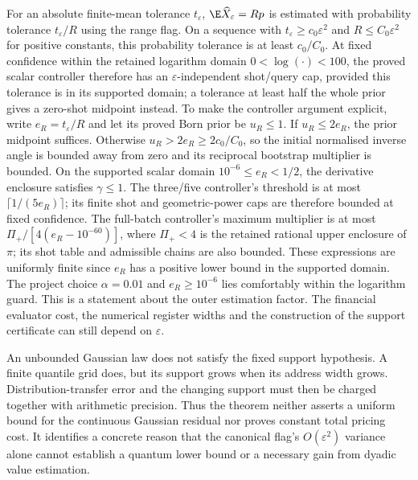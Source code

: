 For an absolute finite-mean tolerance $t_\varepsilon$,
$\E\widehat X_\varepsilon=R p$ is estimated with probability tolerance
$t_\varepsilon/R$ using the range flag. On a sequence with
$t_\varepsilon\geq c_0\varepsilon^2$ and
$R\leq C_0\varepsilon^2$ for positive constants, this probability
tolerance is at least $c_0/C_0$. At fixed confidence within the retained logarithm domain $0<\log(\cdot)<100$, the proved scalar
controller therefore has an $\varepsilon$-independent shot/query cap,
provided this tolerance is in its supported domain; a tolerance at least
half the whole prior gives a zero-shot midpoint instead. To make the controller argument explicit, write $e_R=t_\varepsilon/R$
and let its proved Born prior be $u_R\leq1$. If $u_R\leq2e_R$, the prior
midpoint suffices. Otherwise $u_R>2e_R\geq2c_0/C_0$, so the initial
normalised inverse angle is bounded away from zero and its reciprocal
bootstrap multiplier is bounded. On the supported scalar domain
$10^{-6}\leq e_R<1/2$, the derivative enclosure satisfies $\gamma\leq1$.
The three/five controller's threshold is at most
$\lceil1/(5e_R)\rceil$; its finite shot and geometric-power caps are
therefore bounded at fixed confidence. The full-batch controller's maximum
multiplier is at most $\Pi_+/[4(e_R-10^{-60})]$, where $\Pi_+<4$ is the retained rational upper enclosure of $\pi$; its shot table and admissible
chains are also bounded. These expressions are uniformly finite since
$e_R$ has a positive lower bound in the supported domain. The project choice $\alpha=0.01$ and $e_R\geq10^{-6}$ lies comfortably within the logarithm guard. This is a statement
about the outer estimation factor. The financial evaluator cost, the
numerical register widths and the construction of the support certificate
can still depend on $\varepsilon$.

An unbounded Gaussian law does not satisfy the fixed support hypothesis.
A finite quantile grid does, but its support grows when its address width
grows. Distribution-transfer error and the changing support must then be
charged together with arithmetic precision. Thus the theorem neither
asserts a uniform bound for the continuous Gaussian residual nor proves
constant total pricing cost. It identifies a concrete reason that the
canonical flag's $O(\varepsilon^2)$ variance alone cannot establish a
quantum lower bound or a necessary gain from dyadic value estimation.
